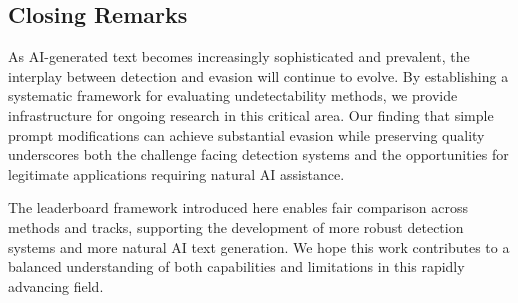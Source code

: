 \subsection{Closing Remarks}

As AI-generated text becomes increasingly sophisticated and prevalent, the interplay between detection and evasion will continue to evolve. By establishing a systematic framework for evaluating undetectability methods, we provide infrastructure for ongoing research in this critical area. Our finding that simple prompt modifications can achieve substantial evasion while preserving quality underscores both the challenge facing detection systems and the opportunities for legitimate applications requiring natural AI assistance.

The leaderboard framework introduced here enables fair comparison across methods and tracks, supporting the development of more robust detection systems and more natural AI text generation. We hope this work contributes to a balanced understanding of both capabilities and limitations in this rapidly advancing field.
